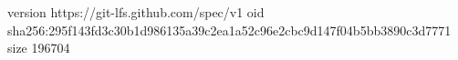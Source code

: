 version https://git-lfs.github.com/spec/v1
oid sha256:295f143fd3c30b1d986135a39c2ea1a52c96e2cbc9d147f04b5bb3890c3d7771
size 196704
